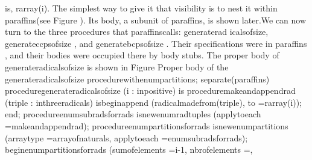 is, \tyxffmxmono[]r\Symuns[]array(i)\tyxffmxendmono[]. The simplest
way to give it that visibility is to nest it within %
\tyxffmxmono[]paraffins\tyxffmxendmono[] (see Figure ).
Its body, a subunit of \tyxffmxmono[]paraffins\tyxffmxendmono[], is
shown later.\Endpara[]
\Para[]We can now turn to the three procedures that %
\tyxffmxmono[]paraffins\tyxffmxendmono[] calls: \tyxffmxmono[]generate\Symuns[]rad%
\tyxdishyph[]icals\Symuns[]of\Symuns[]size\tyxffmxendmono[], %
\tyxffmxmono[]generate\Symuns[]ccps\Symuns[]of\Symuns[]size%
\tyxffmxendmono[], and \tyxffmxmono[]generate\Symuns[]bcps\Symuns[]of\Symuns[]size%
\tyxffmxendmono[]. Their specifications were in \tyxffmxmono[]paraffins%
\tyxffmxendmono[], and their bodies were occupied there by body stubs.
The proper body of \tyxffmxmono[]generate\Symuns[]radicals\Symuns[]of\Symuns[]size%
\tyxffmxendmono[] is shown in Figure
\Parbox[]
Proper body
of the \tyxffmxmono[]generate\Symuns[]radicals\Symuns[]of\Symuns[]size%
\tyxffmxendmono[] procedure\FgEndcap[]
\Comp[]\tyxtstxbf[]with\tyxtstxendbf[] enum\Symuns[]partitions;
\tyxtstxbf[]separate\tyxtstxendbf[] (paraffins)
\tyxtstxbf[]procedure\tyxtstxendbf[] generate\Symuns[]radicals\Symuns[]of\Symuns[]size (i : %
\tyxtstxbf[]in\tyxtstxendbf[] positive) \tyxtstxbf[]is%
\tyxtstxendbf[]
   \tyxtstxbf[]procedure\tyxtstxendbf[] make\Symuns[]and\Symuns[]append\Symuns[]rad (triple : %
\tyxtstxbf[]in\tyxtstxendbf[] three\Symuns[]radicals) %
\tyxtstxbf[]is\tyxtstxendbf[] 
   \tyxtstxbf[]begin\tyxtstxendbf[]
      append (radical\Symuns[]made\Symuns[]from(triple), to =\Symgt[] r\Symuns[]array(i));
   \tyxtstxbf[]end\tyxtstxendbf[];
   \tyxtstxbf[]procedure\tyxtstxendbf[] enum\Symuns[]subrads\Symuns[]for\Symuns[]rads %
\tyxtstxbf[]is\tyxtstxendbf[]
      \tyxtstxbf[]new\tyxtstxendbf[] enum\Symuns[]rad\Symuns[]tuples (apply\Symuns[]to\Symuns[]each =\Symgt[] make\Symuns[]and\Symuns[]append\Symuns[]rad);
   \tyxtstxbf[]procedure\tyxtstxendbf[] enum\Symuns[]partitions\Symuns[]for\Symuns[]rads %
\tyxtstxbf[]is\tyxtstxendbf[]
      \tyxtstxbf[]new\tyxtstxendbf[] enum\Symuns[]partitions (array\Symuns[]type    =\Symgt[] array\Symuns[]of\Symuns[]naturals,
                           apply\Symuns[]to\Symuns[]each =\Symgt[] enum\Symuns[]subrads\Symuns[]for\Symuns[]rads);
\tyxtstxbf[]begin\tyxtstxendbf[]
   enum\Symuns[]partitions\Symuns[]for\Symuns[]rads (sum\Symuns[]of\Symuns[]elements =\Symgt[] i-1,
                             nbr\Symuns[]of\Symuns[]elements =,
